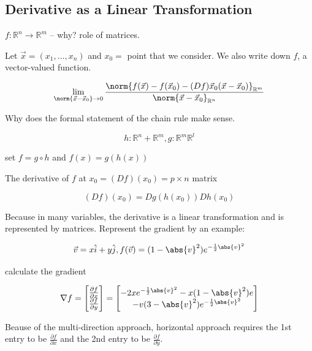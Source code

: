 \documentclass{scrreprt}
\begin{document}
\subsection{Derivative as a Linear Transformation}

$f:\mathbb{R}^n\rightarrow \mathbb{R}^m$ -- why? role of matrices.

\begin{definition}
	Let $\vec{x}=(x_1, \ldots, x_n)$ and $x_0=$ point
	that we consider. We also write down $f$, a vector-valued function.

	\[
		\lim_{\norm{\vec{x}-\vec{x}_0}\rightarrow 0}
		\frac{\norm{f(\vec{x}) - f(\vec{x}_0) - (Df)\vec{x}_0(\vec{x}-\vec{x}_0)}_{\mathbb{R}^m}}
		{\norm{\vec{x}-\vec{x}_0}_{\mathbb{R}^n}}
	\]

	Why does the formal statement of the chain rule make sense.

	\[
		h: \mathbb{R}^n + \mathbb{R}^m, g: \mathbb{R}^m \mathbb{R}^l
	\]

	set $f=g\circ h$ and $f(x) = g(h(x))$

	The derivative of $f$ at $x_0 = (Df)(x_0) = p\times n$ matrix

	\[
		(Df)(x_0) = Dg(h(x_0))Dh(x_0)
	\]

\end{definition}


Because in many variables, the derivative is a linear transformation and is
represented by matrices. Represent the gradient by an example:

\begin{example}
	\[
		\vec{v}=x\hat{i} + y\hat{j}, f(\vec{v}) = (1-\abs{v}^2)e^{-\frac{1}{2}\abs{v}^2}
	\]

	calculate the gradient

	\[
		\nabla f = \begin{bmatrix}
			\frac{\partial f}{\partial x} \\
			\frac{\partial f}{\partial y}
		\end{bmatrix} = \begin{bmatrix}
			-2xe^{-\frac{1}{2}\abs{v}^2} - x(1-\abs{v}^2)e \\
			-v(3-\abs{v}^2)e^{-\frac{1}{2}\abs{v}^2}
		\end{bmatrix}
	\]
\end{example}

Beause of the multi-direction approach, horizontal approach requires the 1st entry
to be $\frac{\partial f}{\partial x}$ and the 2nd entry to be $\frac{\partial f}{\partial y}$.
\end{document}
